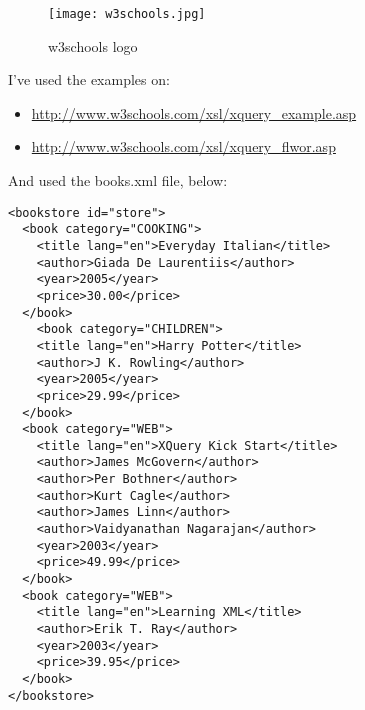 \begin{figure}[h]
\centering
\texttt{[image: w3schools.jpg]}
\caption{w3schools logo\cite{w3schools}}
\label{fig:w3schools_logo}
\end{figure}

I've used the examples on:
\begin{itemize}
\item \url{http://www.w3schools.com/xsl/xquery_example.asp}
\item \url{http://www.w3schools.com/xsl/xquery_flwor.asp}
\end{itemize}

And used the books.xml file, below: 

\begin{lstlisting}[style=xml, frame=single, caption={books.xml}]
<bookstore id="store">  
  <book category="COOKING">
    <title lang="en">Everyday Italian</title>
    <author>Giada De Laurentiis</author>
    <year>2005</year>
    <price>30.00</price>
  </book>
    <book category="CHILDREN">
    <title lang="en">Harry Potter</title>
    <author>J K. Rowling</author>
    <year>2005</year>
    <price>29.99</price>
  </book>
  <book category="WEB">
    <title lang="en">XQuery Kick Start</title>
    <author>James McGovern</author>
    <author>Per Bothner</author>
    <author>Kurt Cagle</author>
    <author>James Linn</author>
    <author>Vaidyanathan Nagarajan</author>
    <year>2003</year>
    <price>49.99</price>
  </book>
  <book category="WEB">
    <title lang="en">Learning XML</title>
    <author>Erik T. Ray</author>
    <year>2003</year>
    <price>39.95</price>
  </book>
</bookstore> 
\end{lstlisting}
\newpage


